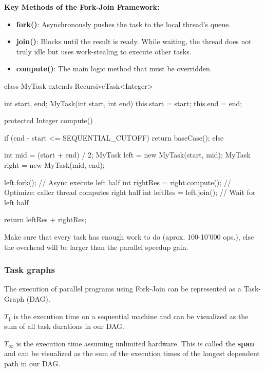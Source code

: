 \textbf{Key Methods of the Fork-Join Framework:}
\begin{itemize}
    \item \textbf{fork()}: Asynchronously pushes the task to the local thread's queue.
    \item \textbf{join()}: Blocks until the result is ready. While waiting, the thread does not truly idle but uses work-stealing to execute other tasks.
    \item \textbf{compute()}: The main logic method that must be overridden.
\end{itemize}

\begin{codeexample}
class MyTask extends RecursiveTask<Integer> {
    int start, end;
    MyTask(int start, int end) { this.start = start; this.end = end; }
    
    protected Integer compute() {
        if (end - start <= SEQUENTIAL_CUTOFF) { 
            return baseCase(); 
        } else {
            int mid = (start + end) / 2;
            MyTask left = new MyTask(start, mid);
            MyTask right = new MyTask(mid, end);
            
            left.fork(); // Async execute left half
            int rightRes = right.compute(); // Optimize: caller thread computes right half
            int leftRes = left.join();      // Wait for left half
            
            return leftRes + rightRes;
        } 
    }
}
\end{codeexample}

\begin{important}
    Make sure that every task has enough work to do (aprox. 100-10'000 ops.), else the overhead will be larger than the parallel speedup gain.
\end{important}

\subsubsection{Task graphs}

The execution of parallel programs using Fork-Join can be represented as a Task-Graph (DAG).

\begin{definition}
    $T_1$ is the execution time on a sequential machine and can be visualized as the sum of all task durations in our DAG.
\end{definition}

\begin{definition}
    $T_{\infty}$ is the execution time assuming unlimited hardware. This is called the \textbf{span} and can be visualized as the sum of the execution times of the longest dependent path in our DAG.
\end{definition}

